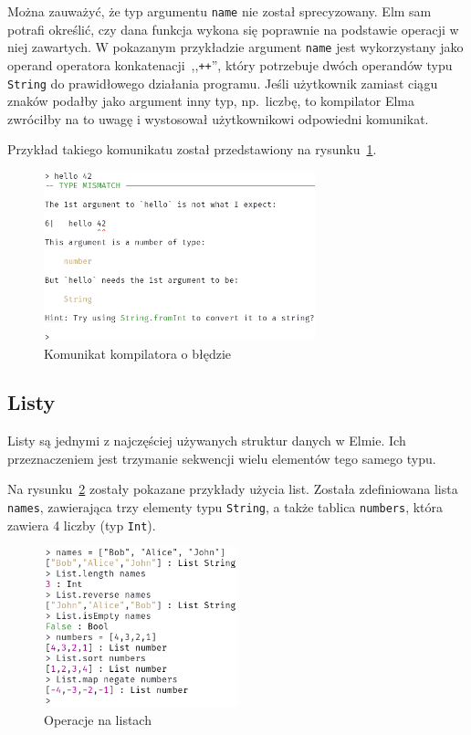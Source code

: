 \documentclass[twoside,a4paper]{report}
\begin{document}
Można zauważyć, że typ argumentu \texttt{name} nie został sprecyzowany.
Elm sam potrafi określić, czy dana funkcja wykona się poprawnie na podstawie operacji w niej zawartych.
W pokazanym przykładzie argument \texttt{name} jest wykorzystany jako operand operatora konkatenacji~,,\texttt{++}'', który potrzebuje dwóch operandów typu \texttt{String} do prawidłowego działania programu.
Jeśli użytkownik zamiast ciągu znaków podałby jako argument inny typ, np.~liczbę, to kompilator Elma zwróciłby na to uwagę i wystosował użytkownikowi odpowiedni komunikat.

Przykład takiego komunikatu został przedstawiony na rysunku~\ref{lab:repl_error}.

\begin{figure}[H]
    \centering
    \includegraphics[width=0.7\textwidth]{img/repl_error}
    \caption{Komunikat kompilatora o błędzie}\label{lab:repl_error}
\end{figure}

\subsection*{Listy}
Listy są jednymi z najczęściej używanych struktur danych w Elmie.
Ich przeznaczeniem jest trzymanie sekwencji wielu elementów tego samego typu.

Na rysunku~\ref{lab:repl_lists} zostały pokazane przykłady użycia list. Została zdefiniowana lista \texttt{names}, zawierająca trzy elementy typu \texttt{String}, a także tablica \texttt{numbers}, która zawiera 4 liczby (typ \texttt{Int}).

\begin{figure}[H]
    \centering
    \includegraphics[width=0.5\textwidth]{img/repl_lists}
    \caption{Operacje na listach}\label{lab:repl_lists}
\end{figure}
\end{document}
